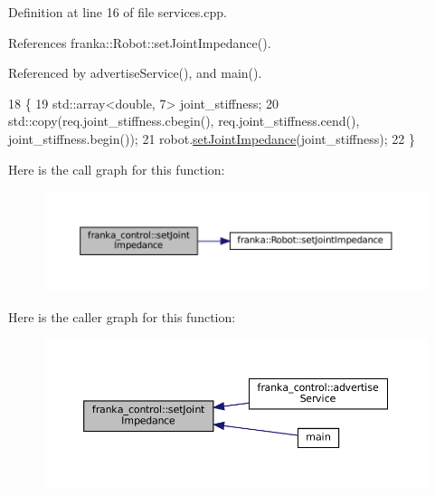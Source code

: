 Definition at line 16 of file services.\+cpp.



References franka\+::\+Robot\+::set\+Joint\+Impedance().



Referenced by advertise\+Service(), and main().


\begin{DoxyCode}
18                                                      \{
19   std::array<double, 7> joint\_stiffness;
20   std::copy(req.joint\_stiffness.cbegin(), req.joint\_stiffness.cend(), joint\_stiffness.begin());
21   robot.\hyperlink{classfranka_1_1Robot_aa18a28697cf6e3be16c6cff2dd839560}{setJointImpedance}(joint\_stiffness);
22 \}
\end{DoxyCode}
Here is the call graph for this function\+:
\nopagebreak
\begin{figure}[H]
\begin{center}
\leavevmode
\includegraphics[width=350pt]{namespacefranka__control_a38bda5f02b38367b199e8599993994ca_cgraph}
\end{center}
\end{figure}
Here is the caller graph for this function\+:
\nopagebreak
\begin{figure}[H]
\begin{center}
\leavevmode
\includegraphics[width=350pt]{namespacefranka__control_a38bda5f02b38367b199e8599993994ca_icgraph}
\end{center}
\end{figure}
\mbox{\label{namespacefranka__control_a733bf6cd47763b70eaf44b7b5a237af9}} 
